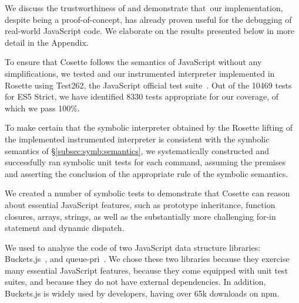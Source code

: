 
We discuss the trustworthiness of \cosette and demonstrate that~our implementation, despite being  a proof-of-concept, has already proven useful for the debugging of real-world JavaScript code.
We elaborate on the results presented below in more detail in the Appendix. 

To ensure that Cosette follows the semantics of JavaScript without any simplifications, we tested \JSComp and our instrumented \jsil interpreter implemented in Rosette using Test262, the JavaScript official test suite~\cite{test262}. 
Out of the 10469 tests for ES5 Strict, we have identified 8330 tests appropriate for our coverage, of which we pass 100\%.

 To make certain that the symbolic \jsil interpreter obtained by the Rosette lifting of the implemented instrumented interpreter is consistent with the symbolic semantics of \S\ref{subsec:symb:semantics}, we systematically constructed and successfully ran symbolic unit tests for each \jsil command, assuming the premises and asserting the conclusion of the appropriate rule of the symbolic semantics.


We created a number of symbolic tests to demonstrate that Cosette can reason about essential JavaScript features, such as prototype inheritance, function closures, arrays, strings, as well as the substantially more challenging for-in statement and dynamic dispatch. 

We used \cosette to analyse the code of two JavaScript data structure libraries: Buckets.js~\cite{buckets}, and queue-pri~\cite{priq}.
We chose these two libraries because they exercise many essential JavaScript features, because they come equipped with unit test suites, and because they do not have external dependencies. In addition, Buckets.js is widely used by developers, having over 65k downloads on npm.

